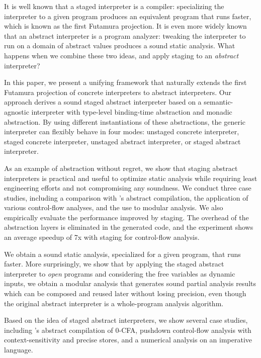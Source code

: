 It is well known that a staged interpreter is a compiler: specializing the
interpreter to a given program produces an equivalent program that runs faster,
which is known as the first Futamura projection. It is even more widely known that an
abstract interpreter is a program analyzer: tweaking the interpreter to run on a
domain of abstract values produces a sound static analysis. What happens when we
combine these two ideas, and apply staging to an \emph{abstract} interpreter?

In this paper, we present a unifying framework that naturally extends the first
Futamura projection of concrete interpreters to abstract interpreters. Our
approach derives a sound staged abstract interpreter based on a
semantic-agnostic interpreter with type-level binding-time abstraction and
monadic abstraction. By using different instantiations of these abstractions,
the generic interpreter can flexibly behave in four modes: unstaged concrete
interpreter, staged concrete interpreter, unstaged abstract interpreter, or
staged abstract interpreter.

As an example of abstraction without regret, we show that staging abstract
interpreters is practical and useful to optimize static analysis while requiring
least engineering efforts and not compromising any soundness. We conduct three
case studies, including a comparison with
\citeauthor{Boucher:1996:ACN:647473.727587}'s abstract compilation,
the application of various control-flow analyses, and the use to modular
analysis. We also empirically evaluate the performance improved by staging. The
overhead of the abstraction layers is eliminated in the generated code, and the 
experiment shows an average speedup of 7x with staging for control-flow analysis.

\iffalse
We obtain a sound static analysis, specialized for
a given program, that runs faster. More surprisingly, we show that by applying
the staged abstract interpreter to \textit{open} programs and considering the
free variables as dynamic inputs, we obtain a modular analysis that generates
sound partial analysis results which can be composed and reused later without
losing precision, even though the original abstract interpreter is a
whole-program analysis algorithm.

Based on the idea of staged abstract interpreters, we show several case studies,
including \citeauthor{Boucher:1996:ACN:647473.727587}'s abstract compilation of
0-CFA, pushdown control-flow analysis with context-sensitivity and precise
stores, and a numerical analysis on an imperative language.

